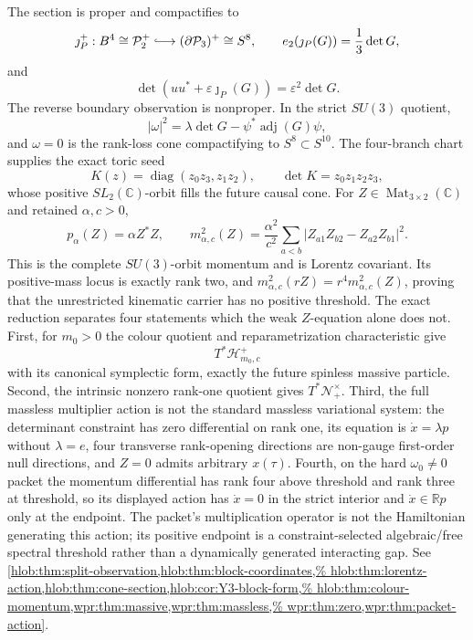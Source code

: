 \begin{enumerate}[leftmargin=1.8em,itemsep=.65em]
The section is proper and compactifies to
\[
 \jmath_P^+:B^4\cong\mathcal P_2^+
 \lhook\joinrel\longrightarrow(\partial\mathcal P_3)^+\cong S^8,\qquad
 e_2(\jmath_P(G))=\frac13\det G,
\]
and
\[
 \det(uu^*+\varepsilon\jmath_P(G))=\varepsilon^2\det G.
\]
The reverse boundary observation is nonproper.  In the strict \(SU(3)\)
quotient,
\[
 |\omega|^2=\lambda\det G-\psi^*\operatorname{adj}(G)\psi,
\]
and \(\omega=0\) is the rank-loss cone compactifying to
\(S^8\subset S^{10}\).  The four-branch chart supplies the exact toric seed
\[
 K(z)=\operatorname{diag}(z_0z_3,z_1z_2),\qquad
 \det K=z_0z_1z_2z_3,
\]
whose positive \(SL_2(\mathbb C)\)-orbit fills the future causal cone.
For \(Z\in\operatorname{Mat}_{3\times2}(\mathbb C)\) and retained
\(\alpha,c>0\),
\[
 p_\alpha(Z)=\alpha Z^*Z,\qquad
 m_{\alpha,c}^2(Z)=\frac{\alpha^2}{c^2}
 \sum_{a<b}|Z_{a1}Z_{b2}-Z_{a2}Z_{b1}|^2.
\]
This is the complete \(SU(3)\)-orbit momentum and is Lorentz covariant.
Its positive-mass locus is exactly rank two, and
\(m_{\alpha,c}^2(rZ)=r^4m_{\alpha,c}^2(Z)\), proving that the unrestricted
kinematic carrier has no positive threshold.  The exact reduction separates
four statements which the weak \(Z\)-equation alone does not.  First, for
\(m_0>0\) the colour quotient and reparametrization characteristic give
\[
 T^*\mathcal H^+_{m_0,c}
\]
with its canonical symplectic form, exactly the future spinless massive
particle.  Second, the intrinsic nonzero rank-one quotient gives
\(T^*\mathcal N_+^\times\).  Third, the full massless multiplier action is not
the standard massless variational system: the determinant constraint has zero
differential on rank one, its equation is \(\dot x=\lambda p\) without
\(\lambda=e\), four transverse rank-opening directions are non-gauge
first-order null directions, and \(Z=0\) admits arbitrary \(x(\tau)\).
Fourth, on the hard \(\omega_0\ne0\) packet the momentum differential has
rank four above threshold and rank three at threshold, so its displayed
action has \(\dot x=0\) in the strict interior and
\(\dot x\in\mathbb Rp\) only at the endpoint.  The packet's multiplication
operator is not the Hamiltonian generating this action; its positive endpoint
is a constraint-selected algebraic/free spectral threshold rather than a
dynamically generated interacting gap.  See
\cref{hlob:thm:split-observation,hlob:thm:block-coordinates,%
hlob:thm:lorentz-action,hlob:thm:cone-section,hlob:cor:Y3-block-form,%
hlob:thm:colour-momentum,wpr:thm:massive,wpr:thm:massless,%
wpr:thm:zero,wpr:thm:packet-action}.


\end{enumerate}
